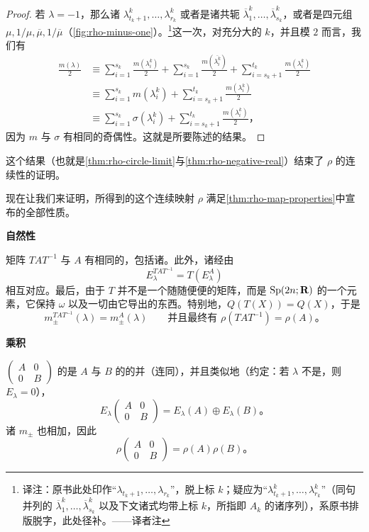 \begin{proof}
若 $\lambda=-1$，那么诸\trEigenvalue{} $\lambda^k_{t_k+1},\dotsc,\lambda^k_{r_k}$ 或者是诸共轭 $\overline{\lambda}^k_1,\dotsc,\overline{\lambda}^k_{s_k}$，或者是四元组 $\mu,1/\mu,\overline{\mu},1/\overline{\mu}$（\cref{fig:rho-minus-one}）。\footnote{译注：原书此处印作“$\lambda_{t_k+1},\dotsc,\lambda_{r_k}$”，脱上标 $k$；疑应为“$\lambda^k_{t_k+1},\dotsc,\lambda^k_{r_k}$”（同句并列的 $\overline{\lambda}^k_1,\dotsc,\overline{\lambda}^k_{s_k}$ 以及下文诸式均带上标 $k$，所指即 $A_k$ 的诸\trEigenvalue{}序列），系原书排版脱字，此处径补。——译者注}这一次，对充分大的 $k$，并且模 $2$ 而言，我们有
\[
\begin{aligned}
\frac{m(\lambda)}{2}
&\equiv\sum_{i=1}^{s_k}\frac{m(\lambda^k_i)}{2}
+\sum_{i=1}^{s_k}\frac{m(\overline{\lambda_i^k})}{2}
+\sum_{i=s_k+1}^{t_k}\frac{m(\lambda^k_i)}{2}\\
&\equiv\sum_{i=1}^{s_k}m(\lambda^k_i)+\sum_{i=s_k+1}^{t_k}\frac{m(\lambda^k_i)}{2}\\
&\equiv\sum_{i=1}^{s_k}\sigma(\lambda^k_i)+\sum_{i=s_k+1}^{t_k}\frac{m(\lambda^k_i)}{2}\text{，}
\end{aligned}
\]
因为 $m$ 与 $\sigma$ 有相同的奇偶性。这就是所要陈述的结果。
\end{proof}

这个结果（也就是\cref{thm:rho-circle-limit}与\cref{thm:rho-negative-real}）结束了 $\rho$ 的连续性的证明。\noqed

现在让我们来证明，所得到的这个连续映射 $\rho$ 满足\cref{thm:rho-map-properties}中宣布的全部性质。

\par\nopagebreak
\textbf{自然性}\nopagebreak

矩阵 $TAT^{-1}$ 与 $A$ 有相同的\trSpectrum，包括诸\trMultiplicity。此外，诸\trGeneralizedEigenspace{}经由
\[
E^{TAT^{-1}}_\lambda=T(E^A_\lambda)
\]
相互对应。最后，由于 $T$ 并不是一个随随便便的\trInvertible{}矩阵，而是 $\mathrm{Sp}(2n;\mathbf{R})$ 的一个元素，它保持\trSymplecticForm{} $\omega$ 以及一切由它导出的东西。特别地，$Q(T(X))=Q(X)$，于是
\[
m^{TAT^{-1}}_\pm(\lambda)=m^A_\pm(\lambda)
\qquad\text{并且最终有 }\rho(TAT^{-1})=\rho(A)\text{。}
\]
\noqed

\par\nopagebreak
\textbf{乘积}\nopagebreak

$\left(\begin{smallmatrix}A&0\\0&B\end{smallmatrix}\right)$ 的\trSpectrum{}是 $A$ 与 $B$ 的\trSpectrum{}的并（连同\trMultiplicity），并且类似地（约定：若 $\lambda$ 不是\trEigenvalue，则 $E_\lambda=0$），
\[
E_\lambda\begin{pmatrix}A&0\\0&B\end{pmatrix}=E_\lambda(A)\oplus E_\lambda(B)\text{。}
\]
诸 $m_\pm$ 也相加，因此
\[
\rho\begin{pmatrix}A&0\\0&B\end{pmatrix}=\rho(A)\rho(B)\text{。}
\]
\noqed

